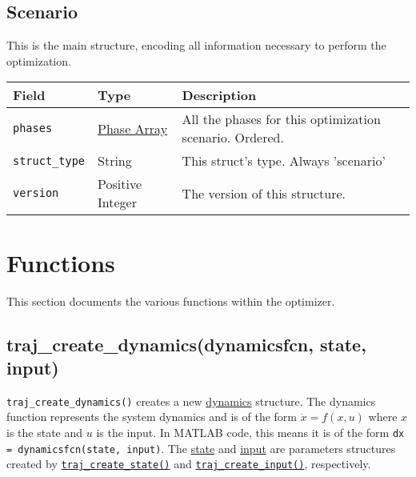 \documentclass{article}
\begin{document}
		\subsection{Scenario}
			\label{sec:scenario} %

			This is the main structure, encoding all information necessary to perform the optimization.

			\vspace{\baselineskip}

			\begin{tabular}{ p{} | p{} | p{197pt}}
				Field                    & Type                               & Description                                      \\ \hline
				\lstinline|phases| & \raggedright \hyperref[sec:phase]{Phase Array} & All the phases for this optimization scenario.
				                                                                Ordered.                                         \\[1ex]
				\lstinline|struct_type|  & String                             & This struct's type. Always 'scenario'            \\[1ex]
				\lstinline|version|      & \raggedright Positive Integer      & The version of this structure.
			\end{tabular}

	\section{Functions}
		This section documents the various functions within the optimizer.

		\subsection{traj\_create\_dynamics(dynamicsfcn, state, input)}
			\lstinline|traj_create_dynamics()| creates a new \hyperref[sec:dynamics]{dynamics} structure. The dynamics function
			represents the system dynamics and is of the form $\dot{x} = f(x, u)$ where $x$ is the state and $u$ is the input.
			In MATLAB code, this means it is of the form \lstinline|dx = dynamicsfcn(state, input)|. The \hyperref[sec:state]{state}
			and \hyperref[sec:input]{input} are parameters structures created by
			\hyperref[subsec:traj_create_state]{\lstinline|traj_create_state()|} and
			\hyperref[subsec:traj_create_input]{\lstinline|traj_create_input()|}, respectively.
\end{document}
